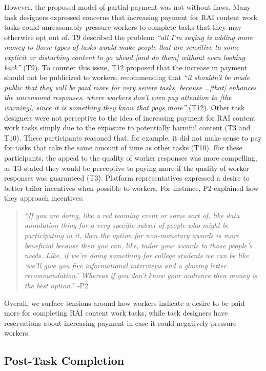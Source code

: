 However, the proposed model of partial payment was not without flaws. Many task designers expressed concerns that increasing payment for RAI content work tasks could unreasonably pressure workers to complete tasks that they may otherwise opt out of.  T9 described the problem: \textit{``all I'm saying is adding more money to those types of tasks would make people that are sensitive to some explicit or disturbing content to go ahead [and do them] without even looking back''} (T9). To counter this issue, T12 proposed that the increase in payment should not be publicized to workers, recommending that \textit{``it shouldn't be made public that they will be paid more for very severe tasks, because \dots [that] enhances the uncensored responses, where workers don't even pay attention to [the warning], since it is something they know that pays more''} (T12). Other task designers were not perceptive to the idea of increasing payment for RAI content work tasks simply due to the exposure to potentially harmful content (T3 and T10). These participants reasoned that, for example, it did not make sense to pay for tasks that take the same amount of time as other tasks (T10). For these participants, the appeal to the quality of worker responses was more compelling, as T3 stated they would be perceptive to paying more if the quality of worker responses was guaranteed (T3). Platform representatives expressed a desire to better tailor incentives when possible to workers. For instance, P2 explained how they approach incentives:
\begin{quote}
    \textit{``If you are doing, like a red teaming event or some sort of, like data annotation thing for a very specific subset of people who might be participating in it, then the option for non-monetary awards is more beneficial because then you can, like, tailor your awards to those people's needs. Like, if we're doing something for college students we can be like `we'll give you five informational interviews and a glowing letter recommendation.' Whereas if you don't know your audience then money is the best option.''} -P2
\end{quote}
Overall, we surface tensions around how workers indicate a desire to be paid more for completing RAI content work tasks, while task designers have reservations about increasing payment in case it could negatively pressure workers. 


\subsection{Post-Task Completion}
